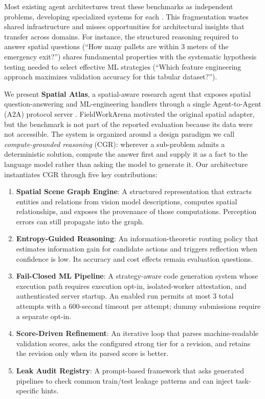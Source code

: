 \documentclass{article}
\begin{document}
\smallskip
Most existing agent architectures treat these benchmarks as independent problems, developing specialized systems for each \citep{yang2024sweagent, hong2024opendevin}. This fragmentation wastes shared infrastructure and misses opportunities for architectural insights that transfer across domains. For instance, the structured reasoning required to answer spatial questions (``How many pallets are within 3 meters of the emergency exit?'') shares fundamental properties with the systematic hypothesis testing needed to select effective ML strategies (``Which feature engineering approach maximizes validation accuracy for this tabular dataset?'').

\smallskip
We present \textbf{Spatial Atlas}, a spatial-aware research agent that exposes spatial question-answering and ML-engineering handlers through a single Agent-to-Agent (A2A) protocol server \citep{google2024a2a}. FieldWorkArena motivated the original spatial adapter, but the benchmark is not part of the reported evaluation because its data were not accessible. The system is organized around a design paradigm we call \emph{compute-grounded reasoning} (CGR): wherever a sub-problem admits a deterministic solution, compute the answer first and supply it as a fact to the language model rather than asking the model to generate it. Our architecture instantiates CGR through five key contributions:

\begin{enumerate}[leftmargin=*,nosep]
  \item \textbf{Spatial Scene Graph Engine}: A structured representation that extracts entities and relations from vision model descriptions, computes spatial relationships, and exposes the provenance of those computations. Perception errors can still propagate into the graph.
  \item \textbf{Entropy-Guided Reasoning}: An information-theoretic routing policy that estimates information gain for candidate actions and triggers reflection when confidence is low. Its accuracy and cost effects remain evaluation questions.
  \item \textbf{Fail-Closed ML Pipeline}: A strategy-aware code generation system whose execution path requires execution opt-in, isolated-worker attestation, and authenticated server startup. An enabled run permits at most 3 total attempts with a 600-second timeout per attempt; dummy submissions require a separate opt-in.
  \item \textbf{Score-Driven Refinement}: An iterative loop that parses machine-readable validation scores, asks the configured strong tier for a revision, and retains the revision only when its parsed score is better.
  \item \textbf{Leak Audit Registry}: A prompt-based framework that asks generated pipelines to check common train/test leakage patterns and can inject task-specific hints.
\end{enumerate}
\end{document}
